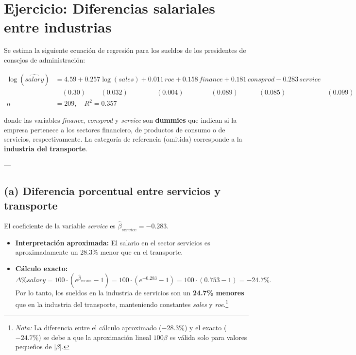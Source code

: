 \documentclass{article}
\begin{document}
\section*{Ejercicio: Diferencias salariales entre industrias}

Se estima la siguiente ecuación de regresión para los sueldos de los presidentes de consejos de administración:

{\small
\begin{align*}
\log(\widehat{salary}) &= 4.59 + 0.257 \log(sales) + 0.011 \, roe + 0.158 \, finance 
 + 0.181 \, consprod - 0.283 \, service \\
&\quad (0.30) \quad \quad \, (0.032) \quad \quad \qquad \, (0.004) \qquad \qquad (0.089) \qquad \quad (0.085) \qquad \qquad \qquad (0.099) \\
n &= 209, \quad R^2 = 0.357
\end{align*}
}

\noindent
donde las variables \textit{finance}, \textit{consprod} y \textit{service} son \textbf{dummies} que indican si la empresa pertenece a los sectores financiero, de productos de consumo o de servicios, respectivamente.  
La categoría de referencia (omitida) corresponde a la \textbf{industria del transporte}.

---

\subsection*{(a) Diferencia porcentual entre servicios y transporte}

El coeficiente de la variable \textit{service} es $\hat{\beta}_{service} = -0.283$.

\begin{itemize}
  \item \textbf{Interpretación aproximada:}  
  El salario en el sector servicios es aproximadamente un $28.3\%$ menor que en el transporte.
  
  \item \textbf{Cálculo exacto:}
  \[
  \Delta \% salary = 100 \cdot \left( e^{\hat{\beta}_{service}} - 1 \right)
  = 100 \cdot (e^{-0.283} - 1)
  = 100 \cdot (0.753 - 1) = -24.7\%.
  \]
  Por lo tanto, los sueldos en la industria de servicios son un \textbf{24.7\% menores} que en la industria del transporte, manteniendo constantes \textit{sales} y \textit{roe}.\footnote{
\textit{Nota:} La diferencia entre el cálculo aproximado ($-28.3\%$) y el exacto ($-24.7\%$) se debe a que la aproximación lineal $100\beta$ es válida solo para valores pequeños de $|\beta|$.
}
\end{itemize}
\end{document}
